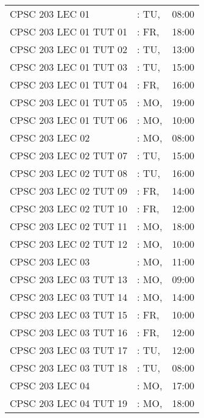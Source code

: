 \documentclass[11pt]{article}
\begin{document}
\begin{longtable}{l l r}
CPSC 203 LEC 01               	&\hspace*{1.5cm}: TU,& 08:00\tabularnewline
CPSC 203 LEC 01 TUT 01       	&\hspace*{1.5cm}: FR,& 18:00\tabularnewline
CPSC 203 LEC 01 TUT 02       	&\hspace*{1.5cm}: TU,& 13:00\tabularnewline
CPSC 203 LEC 01 TUT 03       	&\hspace*{1.5cm}: TU,& 15:00\tabularnewline
CPSC 203 LEC 01 TUT 04       	&\hspace*{1.5cm}: FR,& 16:00\tabularnewline
CPSC 203 LEC 01 TUT 05       	&\hspace*{1.5cm}: MO,& 19:00\tabularnewline
CPSC 203 LEC 01 TUT 06       	&\hspace*{1.5cm}: MO,& 10:00\tabularnewline
CPSC 203 LEC 02               	&\hspace*{1.5cm}: MO,& 08:00\tabularnewline
CPSC 203 LEC 02 TUT 07     	&\hspace*{1.5cm}: TU,& 15:00\tabularnewline
CPSC 203 LEC 02 TUT 08       	&\hspace*{1.5cm}: TU,& 16:00\tabularnewline
CPSC 203 LEC 02 TUT 09       	&\hspace*{1.5cm}: FR,& 14:00\tabularnewline
CPSC 203 LEC 02 TUT 10       	&\hspace*{1.5cm}: FR,& 12:00\tabularnewline
CPSC 203 LEC 02 TUT 11        &\hspace*{1.5cm}: MO,& 18:00\tabularnewline
CPSC 203 LEC 02 TUT 12       	&\hspace*{1.5cm}: MO,& 10:00\tabularnewline
CPSC 203 LEC 03              	&\hspace*{1.5cm}: MO,& 11:00\tabularnewline
CPSC 203 LEC 03 TUT 13     	&\hspace*{1.5cm}: MO,& 09:00\tabularnewline
CPSC 203 LEC 03 TUT 14       	&\hspace*{1.5cm}: MO,& 14:00\tabularnewline
CPSC 203 LEC 03 TUT 15       	&\hspace*{1.5cm}: FR,& 10:00\tabularnewline
CPSC 203 LEC 03 TUT 16       	&\hspace*{1.5cm}: FR,& 12:00\tabularnewline
CPSC 203 LEC 03 TUT 17       	&\hspace*{1.5cm}: TU,& 12:00\tabularnewline
CPSC 203 LEC 03 TUT 18       	&\hspace*{1.5cm}: TU,& 08:00\tabularnewline
CPSC 203 LEC 04              	&\hspace*{1.5cm}: MO,& 17:00\tabularnewline
CPSC 203 LEC 04 TUT 19       	&\hspace*{1.5cm}:  MO,& 18:00\tabularnewline

\end{longtable}
\end{document}
